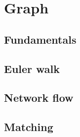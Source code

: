 
\chapter{Graph}

\section{Fundamentals}

\section{Euler walk}

\section{Network flow}

\section{Matching}

